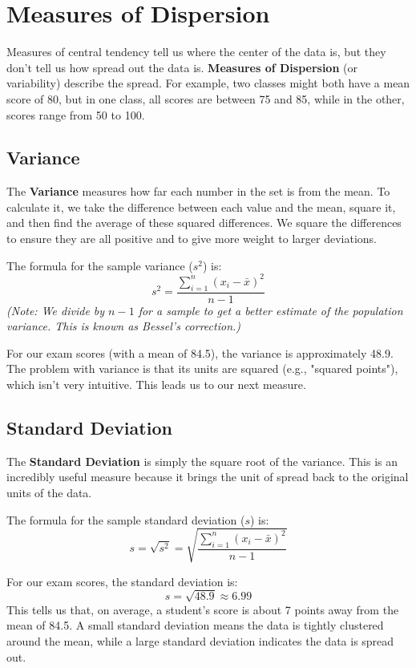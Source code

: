 \section{Measures of Dispersion}

Measures of central tendency tell us where the center of the data is, but they don't tell us how spread out the data is. \textbf{Measures of Dispersion} (or variability) describe the spread. For example, two classes might both have a mean score of 80, but in one class, all scores are between 75 and 85, while in the other, scores range from 50 to 100.

\subsection{Variance}
The \textbf{Variance} measures how far each number in the set is from the mean. To calculate it, we take the difference between each value and the mean, square it, and then find the average of these squared differences. We square the differences to ensure they are all positive and to give more weight to larger deviations.

The formula for the sample variance ($s^2$) is:
\[ s^2 = \frac{\sum_{i=1}^{n} (x_i - \bar{x})^2}{n-1} \]
\textit{(Note: We divide by $n-1$ for a sample to get a better estimate of the population variance. This is known as Bessel's correction.)}

For our exam scores (with a mean of 84.5), the variance is approximately 48.9. The problem with variance is that its units are squared (e.g., "squared points"), which isn't very intuitive. This leads us to our next measure.

\subsection{Standard Deviation}
The \textbf{Standard Deviation} is simply the square root of the variance. This is an incredibly useful measure because it brings the unit of spread back to the original units of the data.

The formula for the sample standard deviation ($s$) is:
\[ s = \sqrt{s^2} = \sqrt{\frac{\sum_{i=1}^{n} (x_i - \bar{x})^2}{n-1}} \]

For our exam scores, the standard deviation is:
\[ s = \sqrt{48.9} \approx 6.99 \]
This tells us that, on average, a student's score is about 7 points away from the mean of 84.5. A small standard deviation means the data is tightly clustered around the mean, while a large standard deviation indicates the data is spread out.

